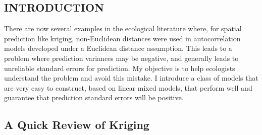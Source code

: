 \documentclass[11pt, titlepage]{article}\usepackage[]{graphicx}\usepackage[]{color}
\begin{document}

\newpage
\begin{spacing}{1.9}
\begin{flushleft}
\setlength{\parindent}{1cm}



\section*{INTRODUCTION}

There are now several examples in the ecological literature where, for spatial prediction like kriging, non-Euclidean distances were used in autocorrelation models developed under a Euclidean distance assumption.  This leads to a problem where prediction variances may be negative, and generally leads to unreliable standard errors for prediction.  My objective is to help ecologists understand the problem and avoid this mistake.  I introduce a class of models that are very easy to construct, based on linear mixed models, that perform well and guarantee that prediction standard errors will be positive.

\subsection*{A Quick Review of Kriging}


\end{flushleft}
\end{spacing}
\end{document}
